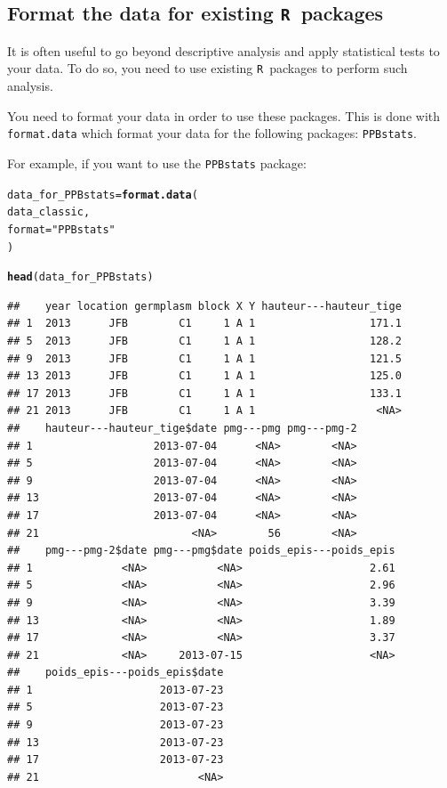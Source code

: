 \documentclass{article}\usepackage[]{graphicx}\usepackage[]{color}
\makeatletter
\newcommand{\hlstr}[1]{\textcolor[rgb]{0.192,0.494,0.8}{#1}}%
\newcommand{\hlstd}[1]{\textcolor[rgb]{0.345,0.345,0.345}{#1}}%
\newcommand{\hlkwb}[1]{\textcolor[rgb]{0.69,0.353,0.396}{#1}}%
\newcommand{\hlkwc}[1]{\textcolor[rgb]{0.333,0.667,0.333}{#1}}%
\newcommand{\hlkwd}[1]{\textcolor[rgb]{0.737,0.353,0.396}{\textbf{#1}}}%
\newenvironment{kframe}{%
 \def\at@end@of@kframe{}%
 \ifinner\ifhmode%
  \def\at@end@of@kframe{\end{minipage}}%
  \begin{minipage}{\columnwidth}%
 \fi\fi%
 \def\FrameCommand##1{\hskip\@totalleftmargin \hskip-\fboxsep
 \colorbox{shadecolor}{##1}\hskip-\fboxsep
     \hskip-\linewidth \hskip-\@totalleftmargin \hskip\columnwidth}%
 \MakeFramed {\advance\hsize-\width
   \@totalleftmargin\z@ \linewidth\hsize
   \@setminipage}}%
 {\par\unskip\endMakeFramed%
 \at@end@of@kframe}
\newenvironment{knitrout}{}{} %
\newcommand{\R}{\texttt{R}}
\newcommand{\listpackformatdata}{\texttt{PPBstats}}
\makeatother
\begin{document}
\subsection{Format the data for existing \R~packages}

It is often useful to go beyond descriptive analysis and apply statistical tests to your data.
To do so, you need to use existing \R~packages to perform such analysis.

You need to format your data in order to use these packages. 
This is done with \texttt{format.data} which format your data for the following packages: \listpackformatdata.

For example, if you want to use the \texttt{PPBstats} package:

\begin{knitrout}
\color{fgcolor}\begin{kframe}
\begin{alltt}
\hlstd{data_for_PPBstats} \hlkwb{=} \hlkwd{format.data}\hlstd{(}
        \hlstd{data_classic,}
        \hlkwc{format} \hlstd{=} \hlstr{"PPBstats"}
\hlstd{)}

\hlkwd{head}\hlstd{(data_for_PPBstats)}
\end{alltt}
\begin{verbatim}
##    year location germplasm block X Y hauteur---hauteur_tige
## 1  2013      JFB        C1     1 A 1                  171.1
## 5  2013      JFB        C1     1 A 1                  128.2
## 9  2013      JFB        C1     1 A 1                  121.5
## 13 2013      JFB        C1     1 A 1                  125.0
## 17 2013      JFB        C1     1 A 1                  133.1
## 21 2013      JFB        C1     1 A 1                   <NA>
##    hauteur---hauteur_tige$date pmg---pmg pmg---pmg-2
## 1                   2013-07-04      <NA>        <NA>
## 5                   2013-07-04      <NA>        <NA>
## 9                   2013-07-04      <NA>        <NA>
## 13                  2013-07-04      <NA>        <NA>
## 17                  2013-07-04      <NA>        <NA>
## 21                        <NA>        56        <NA>
##    pmg---pmg-2$date pmg---pmg$date poids_epis---poids_epis
## 1              <NA>           <NA>                    2.61
## 5              <NA>           <NA>                    2.96
## 9              <NA>           <NA>                    3.39
## 13             <NA>           <NA>                    1.89
## 17             <NA>           <NA>                    3.37
## 21             <NA>     2013-07-15                    <NA>
##    poids_epis---poids_epis$date
## 1                    2013-07-23
## 5                    2013-07-23
## 9                    2013-07-23
## 13                   2013-07-23
## 17                   2013-07-23
## 21                         <NA>
\end{verbatim}
\end{kframe}
\end{knitrout}
\end{document}
